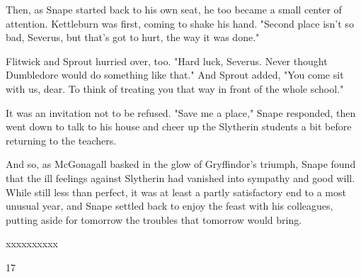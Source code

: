 \documentclass[a4paper,11pt]{article}
\begin{document}
Then, as Snape started back to his own seat, he too became a small center of attention. Kettleburn was first, coming to shake his hand. "Second place isn't so bad, Severus, but that's got to hurt, the way it was done."

Flitwick and Sprout hurried over, too. "Hard luck, Severus. Never thought Dumbledore would do something like that." And Sprout added, "You come sit with us, dear. To think of treating you that way in front of the whole school."

It was an invitation not to be refused. "Save me a place," Snape responded, then went down to talk to his house and cheer up the Slytherin students a bit before returning to the teachers.

And so, as McGonagall basked in the glow of Gryffindor's triumph, Snape found that the ill feelings against Slytherin had vanished into sympathy and good will. While still less than perfect, it was at least a partly satisfactory end to a most unusual year, and Snape settled back to enjoy the feast with his colleagues, putting aside for tomorrow the troubles that tomorrow would bring.

xxxxxxxxxx

17
\end{document}
